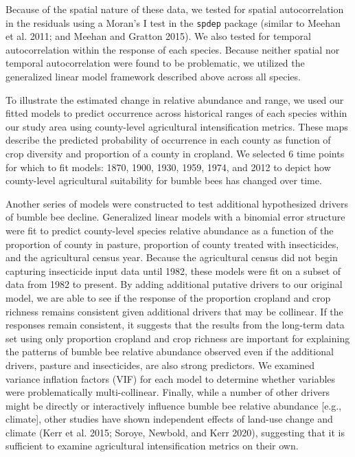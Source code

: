 \documentclass[11pt,]{article}
\begin{document}
Because of the spatial nature of these data, we tested for spatial
autocorrelation in the residuals using a Moran's I test in the
\texttt{spdep} package (similar to Meehan et al. 2011; and Meehan and
Gratton 2015). We also tested for temporal autocorrelation within the
response of each species. Because neither spatial nor temporal
autocorrelation were found to be problematic, we utilized the
generalized linear model framework described above across all species.

To illustrate the estimated change in relative abundance and range, we
used our fitted models to predict occurrence across historical ranges of
each species within our study area using county-level agricultural
intensification metrics. These maps describe the predicted probability
of occurrence in each county as function of crop diversity and
proportion of a county in cropland. We selected 6 time points for which
to fit models: 1870, 1900, 1930, 1959, 1974, and 2012 to depict how
county-level agricultural suitability for bumble bees has changed over
time.

Another series of models were constructed to test additional
hypothesized drivers of bumble bee decline. Generalized linear models
with a binomial error structure were fit to predict county-level species
relative abundance as a function of the proportion of county in pasture,
proportion of county treated with insecticides, and the agricultural
census year. Because the agricultural census did not begin capturing
insecticide input data until 1982, these models were fit on a subset of
data from 1982 to present. By adding additional putative drivers to our
original model, we are able to see if the response of the proportion
cropland and crop richness remains consistent given additional drivers
that may be collinear. If the responses remain consistent, it suggests
that the results from the long-term data set using only proportion
cropland and crop richness are important for explaining the patterns of
bumble bee relative abundance observed even if the additional drivers,
pasture and insecticides, are also strong predictors. We examined
variance inflation factors (VIF) for each model to determine whether
variables were problematically multi-collinear. Finally, while a number
of other drivers might be directly or interactively influence bumble bee
relative abundance {[}e.g., climate{]}, other studies have shown
independent effects of land-use change and climate (Kerr et al. 2015;
Soroye, Newbold, and Kerr 2020), suggesting that it is sufficient to
examine agricultural intensification metrics on their own.
\end{document}
